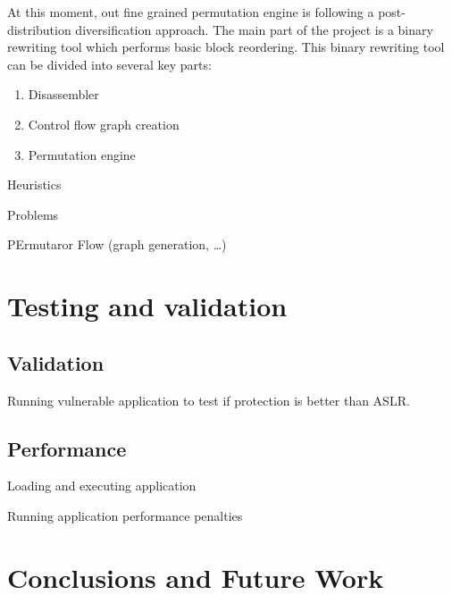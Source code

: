 \documentclass[11pt,final,conference,a4paper]{IEEEtran}
\begin{document}
At this moment, out fine grained permutation engine is following a post-distribution diversification approach. The main part of the project is a binary rewriting tool which performs basic block reordering. This binary rewriting tool can be divided into several key parts:
\begin{enumerate}
\item Disassembler
\item Control flow graph creation
\item Permutation engine
\end{enumerate}

Heuristics

Problems

PErmutaror Flow (graph generation, \ldots)

\section{Testing and validation}
\label{sec:testing}

\subsection{Validation}

Running vulnerable application to test if protection is better than ASLR.

\subsection{Performance}

Loading and executing application

Running application performance penalties

\section{Conclusions and Future Work}
\label{sec:conclusions}




\nocite{arscryptolocker}
\end{document}
